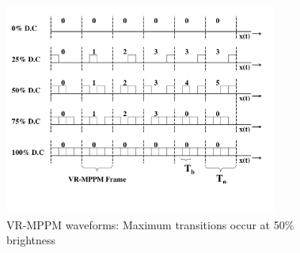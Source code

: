 \begin{figure}[!htbp]
\centering\includegraphics[width=0.8\textwidth]{./Figures/line_code}
\caption[VR-MPPM line waveforms]{VR-MPPM waveforms: Maximum transitions occur at 50\% brightness}
\label{Fig:line_codes2}
\end{figure}
